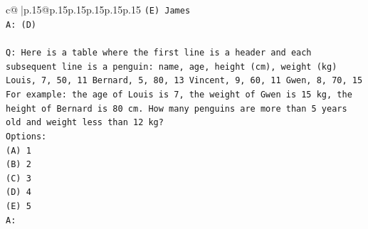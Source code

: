 \documentclass{article}
\begin{document}
{\begin{supertabular}{c@{$\;$}|p{.15\linewidth}@{}p{.15\linewidth}p{.15\linewidth}p{.15\linewidth}p{.15\linewidth}p{.15\linewidth}}
{{{\texttt{(E) James} \\
\texttt{A: (D)} \\
\\ 
\texttt{Q: Here is a table where the first line is a header and each subsequent line is a penguin:  name, age, height (cm), weight (kg) Louis, 7, 50, 11 Bernard, 5, 80, 13 Vincent, 9, 60, 11 Gwen, 8, 70, 15  For example: the age of Louis is 7, the weight of Gwen is 15 kg, the height of Bernard is 80 cm.  How many penguins are more than 5 years old and weight less than 12 kg?} \\
\texttt{Options:} \\
\texttt{(A) 1} \\
\texttt{(B) 2} \\
\texttt{(C) 3} \\
\texttt{(D) 4} \\
\texttt{(E) 5} \\
\texttt{A:} \\
            }
        }
    }
     \\ \\


\end{supertabular}}
\end{document}
